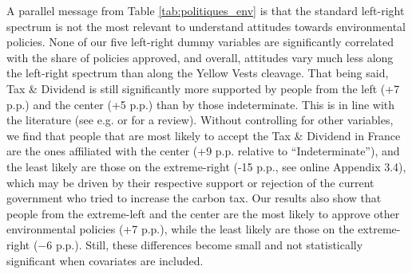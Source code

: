 \documentclass[english,5p,authoryear]{elsarticle}
\begin{document}
A parallel message from Table \ref{tab:politiques_env} is that the standard left-right spectrum is not the most relevant to understand attitudes towards environmental policies. None of our five left-right dummy variables are significantly correlated with the share of policies approved, and overall, attitudes vary much less along the left-right spectrum than along the Yellow Vests cleavage. That being said, Tax \& Dividend is still significantly more supported by people from the left (+7 p.p.) and the center (+5 p.p.) than by those indeterminate. This is in line with the literature (see e.g. \citealt{bornstein_lanz_2008,mccright_increasing_2013} or \citealt{drews_van_der_bergh_2016} for a review). Without controlling for other variables, we find that people that are most likely to accept the Tax \& Dividend in France are the ones affiliated with the center (+9 p.p. relative to ``Indeterminate''), and the least likely are those on the extreme-right (-15 p.p., see online Appendix 3.4), which may be driven by their respective support or rejection of the current government who tried to increase the carbon tax. Our results also show that people from the extreme-left and the center are the most likely to approve other environmental policies (+7 p.p.), while the least likely are those on the extreme-right ($-$6 p.p.). Still, these differences become small and not statistically significant when covariates are included. %
\end{document}
